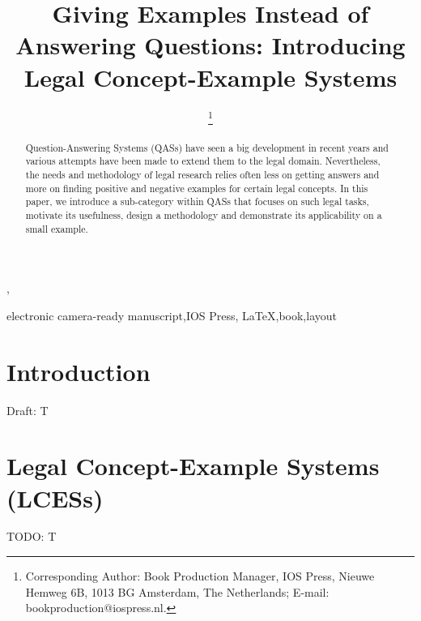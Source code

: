 \documentclass{IOS-Book-Article}
\theoremstyle{definition}
\begin{document}
\begin{frontmatter}              %

\title{Giving Examples Instead of Answering Questions: Introducing Legal Concept-Example Systems}

\author[A]{ %
\thanks{Corresponding Author: Book Production Manager, IOS Press, Nieuwe Hemweg 6B,
1013 BG Amsterdam, The Netherlands; E-mail:
bookproduction@iospress.nl.}},
\author[B]{ }

\address[A]{Book Production Department, IOS Press, The Netherlands}
\address[B]{Computer Science Institute, AGH University of Krakow, Poland}

\begin{abstract}
Question-Answering Systems (QASs) have seen a big development in recent years and various attempts have been made to extend them to the legal domain. Nevertheless, the needs and methodology of legal research relies often less on getting answers and more on finding positive and negative examples for certain legal concepts. In this paper, we introduce a sub-category within QASs that focuses on such legal tasks, motivate its usefulness, design a methodology and demonstrate its applicability on a small example.
\end{abstract}

\begin{keyword}
electronic camera-ready manuscript\sep IOS Press\sep
\LaTeX\sep book\sep layout
\end{keyword}
\end{frontmatter}

\thispagestyle{empty}
\pagestyle{empty}

\section{Introduction}

Draft: T



\section{Legal Concept-Example Systems (LCESs)}
\label{sec:lces}

TODO: T


\end{document}
